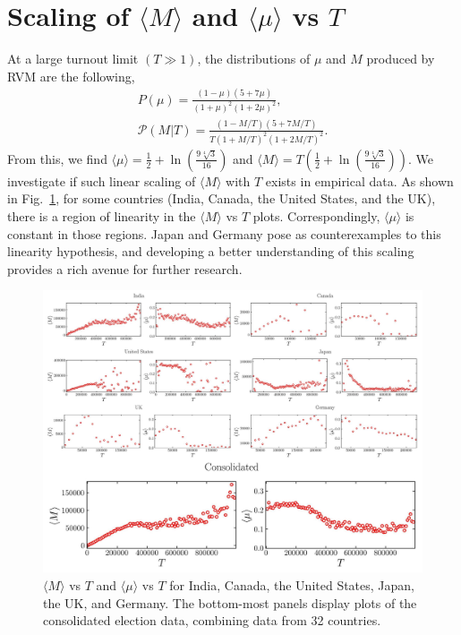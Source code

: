 \documentclass[reprint,aps,prl,showpacs,twocolumn, superscriptaddress]{revtex4-2}
\begin{document}
\section{Scaling of $\langle M \rangle$ and $\langle \mu \rangle$ vs $T$}
At a large turnout limit $(T \gg 1)$, the distributions of $\mu$ and $M$ produced by RVM are the following, 
\begin{align*}
    P(\mu) =  \frac{(1 - \mu)(5 + 7\mu)}{(1 + \mu)^2(1 + 2\mu)^2},\\
    \mathcal{P}(M|T) = \frac{(1 - M / T)(5 + 7M /T)}{T(1 + M / T)^2(1 + 2M / T)^2}.
\end{align*}
From this, we find $\langle \mu \rangle = \frac{1}{2}+\ln \left(\frac{9 \sqrt[4]{3}}{16}\right)$ and $\langle M\rangle = T\left(\frac{1}{2}+\ln \left(\frac{9 \sqrt[4]{3}}{16}\right)\right)$. We investigate if such linear scaling of $\langle M \rangle$ with $T$ exists in empirical data. As shown in Fig.~\ref{fig_supp_2}, for some countries (India, Canada, the United States, and the UK), there is a region of linearity in the $\langle M \rangle$ vs $T$ plots. Correspondingly, $\langle \mu  \rangle$ is constant in those regions. Japan and Germany pose as counterexamples to this linearity hypothesis, and developing a better understanding of this scaling provides a rich avenue for further research. 

\begin{figure}[ht]
    \centering
    \includegraphics[width=1\linewidth]{fig_2_supp_rev_2.pdf}
    \caption{$\langle M \rangle$ vs $T$ and $\langle \mu \rangle$ vs $T$ for India, Canada, the United States, Japan, the UK, and Germany. The bottom-most panels display plots of the consolidated election data, combining data from 32 countries.}
    \label{fig_supp_2}
\end{figure}
\end{document}
